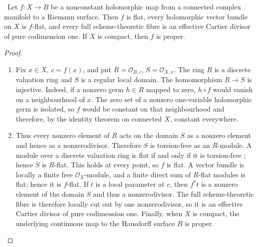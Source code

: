 \begin{lemma}
\hypertarget{tag-03I8}{}\label{wbII:lem:curve-flatness}

\ Let $f:X\to B$ be a nonconstant holomorphic map from a connected
complex manifold to a Riemann surface.  Then $f$ is flat, every holomorphic
vector bundle on $X$ is $f$-flat, and every full scheme-theoretic fibre is an
effective Cartier divisor of pure codimension one.  If $X$ is compact, then
$f$ is proper.
\end{lemma}



\begin{proof}

\begin{enumerate}[label={$\langle1\rangle$\arabic*.},leftmargin=*]
\item Fix $x\in X$, $c=f(x)$, and put
$R=\mathcal O_{B,c}$, $S=\mathcal O_{X,x}$.  The ring $R$ is a discrete
valuation ring and $S$ is a regular local domain.  The homomorphism
$R\to S$ is injective.  Indeed, if a nonzero germ $h\in R$ mapped to zero,
$h\circ f$ would vanish on a neighbourhood of $x$.  The zero set of a
nonzero one-variable holomorphic germ is isolated, so $f$ would be constant
on that neighbourhood and therefore, by the identity theorem on connected
$X$, constant everywhere.

\item Thus every nonzero element of $R$ acts on the domain $S$ as a nonzero
element and hence as a nonzerodivisor.  Therefore $S$ is torsion-free as an
$R$-module.  A module over a discrete valuation ring is flat if and only if
it is torsion-free \cite[Tag~0AUW]{StacksProject}; hence $S$ is $R$-flat.
This holds at every point, so $f$ is flat.  A vector bundle is locally a
finite free $\mathcal O_X$-module, and a finite direct sum of $R$-flat
modules is flat; hence it is $f$-flat.  If $t$ is a local parameter at
$c$, then $f^*t$ is a nonzero element of the domain $S$ and thus a
nonzerodivisor.  The full scheme-theoretic fibre is therefore locally cut
out by one nonzerodivisor, so it is an effective Cartier divisor of pure
codimension one.  Finally, when $X$ is compact, the underlying continuous
map to the Hausdorff surface $B$ is proper.

\end{enumerate}
\end{proof}